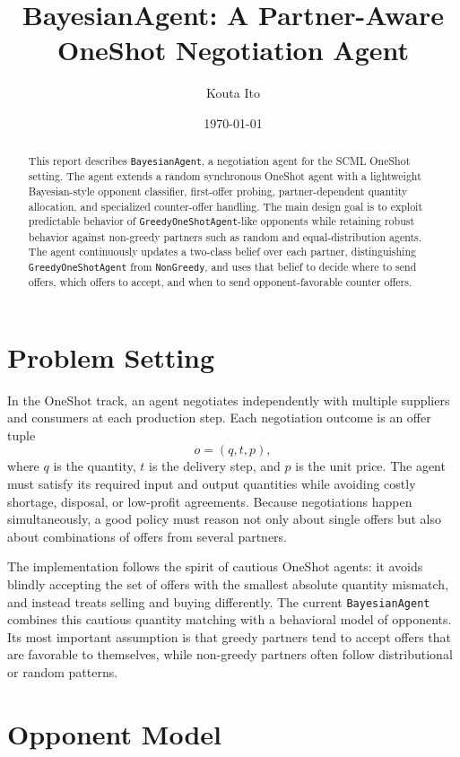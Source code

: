 \documentclass[11pt]{article}
\title{BayesianAgent: A Partner-Aware OneShot Negotiation Agent}
\author{Kouta Ito}
\date{\today}
\begin{document}
\maketitle

\begin{abstract}
This report describes \texttt{BayesianAgent}, a negotiation agent for the
SCML OneShot setting.  The agent extends a random synchronous OneShot agent
with a lightweight Bayesian-style opponent classifier, first-offer probing,
partner-dependent quantity allocation, and specialized counter-offer handling.
The main design goal is to exploit predictable behavior of
\texttt{GreedyOneShotAgent}-like opponents while retaining robust behavior
against non-greedy partners such as random and equal-distribution agents.
The agent continuously updates a two-class belief over each partner,
distinguishing \texttt{GreedyOneShotAgent} from \texttt{NonGreedy}, and uses
that belief to decide where to send offers, which offers to accept, and when to
send opponent-favorable counter offers.
\end{abstract}

\section{Problem Setting}

In the OneShot track, an agent negotiates independently with multiple
suppliers and consumers at each production step.  Each negotiation outcome is
an offer tuple
\[
  o = (q, t, p),
\]
where \(q\) is the quantity, \(t\) is the delivery step, and \(p\) is the unit
price.  The agent must satisfy its required input and output quantities while
avoiding costly shortage, disposal, or low-profit agreements.  Because
negotiations happen simultaneously, a good policy must reason not only about
single offers but also about combinations of offers from several partners.

The implementation follows the spirit of cautious OneShot agents: it avoids
blindly accepting the set of offers with the smallest absolute quantity
mismatch, and instead treats selling and buying differently.  The current
\texttt{BayesianAgent} combines this cautious quantity matching with a
behavioral model of opponents.  Its most important assumption is that greedy
partners tend to accept offers that are favorable to themselves, while
non-greedy partners often follow distributional or random patterns.

\section{Opponent Model}
\end{document}
